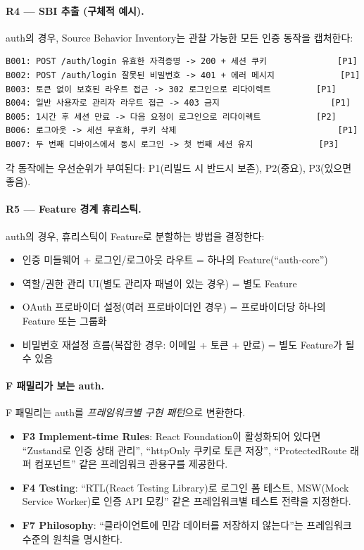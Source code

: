 \documentclass[11pt,a4paper,openright,twoside]{report}
\begin{document}
\paragraph{R4 --- SBI 추출 (구체적 예시).}
auth의 경우, Source Behavior Inventory는 관찰 가능한 모든 인증 동작을 캡처한다:

\begin{lstlisting}
B001: POST /auth/login 유효한 자격증명 -> 200 + 세션 쿠키              [P1]
B002: POST /auth/login 잘못된 비밀번호 -> 401 + 에러 메시지             [P1]
B003: 토큰 없이 보호된 라우트 접근 -> 302 로그인으로 리다이렉트         [P1]
B004: 일반 사용자로 관리자 라우트 접근 -> 403 금지                      [P1]
B005: 1시간 후 세션 만료 -> 다음 요청이 로그인으로 리다이렉트           [P2]
B006: 로그아웃 -> 세션 무효화, 쿠키 삭제                                [P1]
B007: 두 번째 디바이스에서 동시 로그인 -> 첫 번째 세션 유지             [P3]
\end{lstlisting}

각 동작에는 우선순위가 부여된다: P1(리빌드 시 반드시 보존), P2(중요), P3(있으면 좋음).

\paragraph{R5 --- Feature 경계 휴리스틱.}
auth의 경우, 휴리스틱이 Feature로 분할하는 방법을 결정한다:

\begin{itemize}[nosep]
  \item 인증 미들웨어 + 로그인/로그아웃 라우트 = 하나의 Feature(``auth-core'')
  \item 역할/권한 관리 UI(별도 관리자 패널이 있는 경우) = 별도 Feature
  \item OAuth 프로바이더 설정(여러 프로바이더인 경우) = 프로바이더당 하나의 Feature 또는 그룹화
  \item 비밀번호 재설정 흐름(복잡한 경우: 이메일 + 토큰 + 만료) = 별도 Feature가 될 수 있음
\end{itemize}

\paragraph{F 패밀리가 보는 auth.}
F 패밀리는 auth를 \emph{프레임워크별 구현 패턴}으로 변환한다.
\begin{itemize}
  \item \textbf{F3 Implement-time Rules}: React Foundation이 활성화되어 있다면 ``Zustand로 인증 상태 관리'', ``httpOnly 쿠키로 토큰 저장'', ``ProtectedRoute 래퍼 컴포넌트'' 같은 프레임워크 관용구를 제공한다.
  \item \textbf{F4 Testing}: ``RTL(React Testing Library)로 로그인 폼 테스트, MSW(Mock Service Worker)로 인증 API 모킹'' 같은 프레임워크별 테스트 전략을 지정한다.
  \item \textbf{F7 Philosophy}: ``클라이언트에 민감 데이터를 저장하지 않는다''는 프레임워크 수준의 원칙을 명시한다.
\end{itemize}
\end{document}
